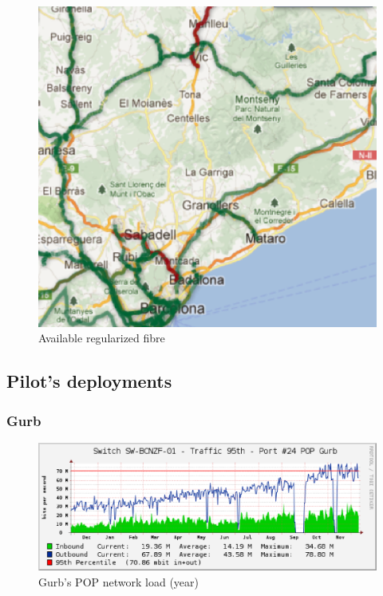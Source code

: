 \begin{figure}[htbp]
  \centering
  \includegraphics[scale=.5]{sect3/figures/xoc_map.eps} 
  \caption{Available regularized fibre}
  \label{fig:xoc_map}
\end{figure}



\subsection{Pilot's deployments}

\subsubsection{Gurb}
\begin{figure}[htbp]
  \centering
  \includegraphics[scale=.65]{sect3/figures/gurb_network_load_year.eps} 
  \caption{Gurb's POP network load (year)}
  \label{fig:gurb_net_load}
\end{figure}


